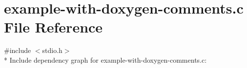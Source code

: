 \hypertarget{example-with-doxygen-comments_8c}{}\section{example-\/with-\/doxygen-\/comments.c File Reference}
\label{example-with-doxygen-comments_8c}
{\ttfamily \#include $<$stdio.\+h$>$}\\*
Include dependency graph for example-\/with-\/doxygen-\/comments.c\+:
